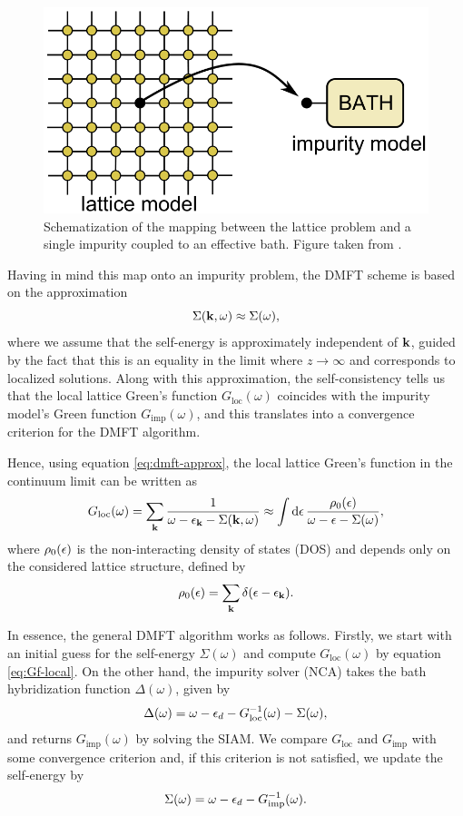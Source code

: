 \documentclass[12pt]{report}
\begin{document}
\begin{figure}[H]
\centering
\includegraphics[width=0.6\linewidth]{fig/dmft-mapping}
\caption{Schematization of the mapping between the lattice problem and a single impurity coupled to an effective bath. Figure taken from \cite{thesis_dmft_graz}.}
\label{fig:dmft-mapping}
\end{figure}

Having in mind this map onto an impurity problem, the DMFT scheme is based on the approximation
\begin{equation} \label{eq:dmft-approx}
\Sigma({\vb{k}}, \omega) \approx \Sigma(\omega),
\end{equation}
where we assume that the self-energy is approximately independent of ${\vb{k}}$, guided by the fact that this is an equality in the limit where $z \to \infty$ and corresponds to localized solutions. Along with this approximation, the self-consistency tells us that the local lattice Green's function $G_{\text{loc}}(\omega)$ coincides with the impurity model's Green function $G_{\text{imp}}(\omega)$, and this translates into a convergence criterion for the DMFT algorithm.

Hence, using equation \ref{eq:dmft-approx}, the local lattice Green's function in the continuum limit can be written as
\begin{equation} \label{eq:Gf-local}
G_{\text{loc}}(\omega) = \sum_{{\vb{k}}} \frac{1}{\omega-\epsilon_{\vb{k}}-\Sigma({\vb{k}}, \omega)} \approx
\int \dd{\epsilon} \frac{\rho_0(\epsilon)}{\omega - \epsilon - \Sigma(\omega)},
\end{equation}
where $\rho_0(\epsilon)$ is the non-interacting density of states (DOS) and depends only on the considered lattice structure, defined by
\begin{equation} \label{eq:non-interacting-DOS}
\rho_0(\epsilon) = \sum_{{\vb{k}}} \delta(\epsilon-\epsilon_{\vb{k}}).
\end{equation}

In essence, the general DMFT algorithm works as follows. Firstly, we start with an initial guess for the self-energy $\Sigma(\omega)$ and compute $G_{\text{loc}}(\omega)$ by equation \ref{eq:Gf-local}. On the other hand, the impurity solver (NCA) takes the bath hybridization function $\Delta(\omega)$, given by
\begin{equation} \label{eq:hybridization-func}
\Delta(\omega) = \omega - \epsilon_d - G_{\text{loc}}^{-1}(\omega) - \Sigma(\omega),
\end{equation}
and returns $G_{\text{imp}}(\omega)$ by solving the SIAM. We compare $G_{\text{loc}}$ and $G_{\text{imp}}$ with some convergence criterion and, if this criterion is not satisfied, we update the self-energy by
\begin{equation} \label{eq:self-energy-update}
\Sigma(\omega) = \omega - \epsilon_d - G_{\text{imp}}^{-1}(\omega).
\end{equation}
\end{document}
